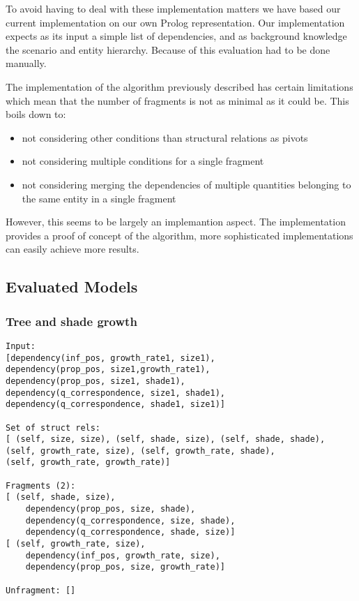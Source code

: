 \documentclass{article} %
\begin{document}
To avoid having to deal with these implementation matters we have based our
current implementation on our own Prolog representation. Our implementation
expects as its input a simple list of dependencies, and as background
knowledge the scenario and entity hierarchy. Because of this evaluation had to
be done manually.

The implementation of the algorithm previously described has certain
limitations which mean that the number of fragments is not as minimal as it
could be. This boils down to:

\begin{itemize}

\item not considering other conditions than structural relations as pivots

\item not considering multiple conditions for a single fragment

\item not considering merging the dependencies of multiple quantities
	belonging to the same entity in a single fragment

\end{itemize}

However, this seems to be largely an implemantion aspect. The implementation
provides a proof of concept of the algorithm, more sophisticated
implementations can easily achieve more results.

\subsection{Evaluated Models}


\subsubsection{Tree and shade growth} 

\begin{verbatim}
Input: 
[dependency(inf_pos, growth_rate1, size1), 
dependency(prop_pos, size1,growth_rate1), 
dependency(prop_pos, size1, shade1),
dependency(q_correspondence, size1, shade1), 
dependency(q_correspondence, shade1, size1)]

Set of struct rels: 
[ (self, size, size), (self, shade, size), (self, shade, shade), 
(self, growth_rate, size), (self, growth_rate, shade), 
(self, growth_rate, growth_rate)]

Fragments (2): 
[ (self, shade, size), 
	dependency(prop_pos, size, shade),
	dependency(q_correspondence, size, shade), 
	dependency(q_correspondence, shade, size)] 
[ (self, growth_rate, size),
	dependency(inf_pos, growth_rate, size),
	dependency(prop_pos, size, growth_rate)]

Unfragment: []
\end{verbatim}
\end{document}
